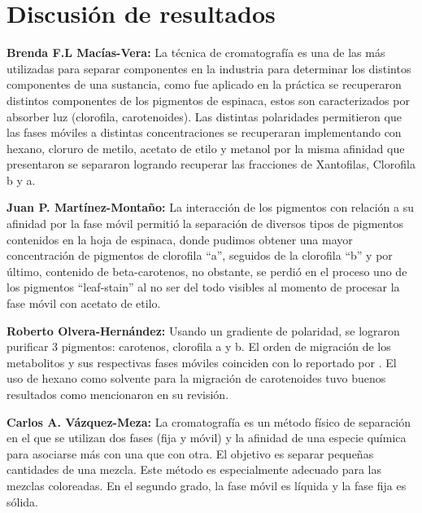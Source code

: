 \documentclass{ITESO-Report}
\begin{document}
\section{Discusión de resultados}

{\color{darkgray}\bfseries Brenda F.L Macías-Vera:}\hspace{1em}
La técnica de cromatografía es una de las más utilizadas para separar componentes en la industria para determinar los distintos componentes de una sustancia, como fue aplicado en la práctica se recuperaron distintos componentes de los pigmentos de espinaca, estos son caracterizados por absorber luz (clorofila, carotenoides). Las distintas polaridades permitieron que las fases móviles a distintas concentraciones se recuperaran implementando con hexano, cloruro de metilo, acetato de etilo y metanol por la misma afinidad que presentaron se separaron logrando recuperar las fracciones de Xantofilas, Clorofila b y a.

{\color{darkgray}\bfseries Juan P. Martínez-Montaño:}\hspace{1em}
La interacción de los pigmentos con relación a su afinidad por la fase móvil permitió la separación de diversos tipos de pigmentos contenidos en la hoja de espinaca, donde pudimos obtener una mayor concentración de pigmentos de clorofila “a”, seguidos de la clorofila “b” y por último, contenido de beta-carotenos, no obstante, se perdió en el proceso uno de los pigmentos “leaf-stain” al no ser del todo visibles al momento de procesar la fase móvil con acetato de etilo.

{\color{darkgray}\bfseries Roberto Olvera-Hernández:}\hspace{1em}
Usando un gradiente de polaridad, se lograron purificar 3 pigmentos: carotenos, clorofila a y b. El orden de migración de los metabolitos y sus respectivas fases móviles coinciden con lo reportado por \textcite{Khalyfa1992}. El uso de hexano como solvente para la migración de carotenoides tuvo buenos resultados como mencionaron \textcite{Mussagy2018} en su revisión.

{\color{darkgray}\bfseries Carlos A. Vázquez-Meza:}\hspace{1em}
La cromatografía es un método físico de separación en el que se utilizan dos fases (fija y móvil) y la afinidad de una especie química para asociarse más con una que con otra. El objetivo es separar pequeñas cantidades de una mezcla. Este método es especialmente adecuado para las mezclas coloreadas. En el segundo grado, la fase móvil es líquida y la fase fija es sólida.
\end{document}
